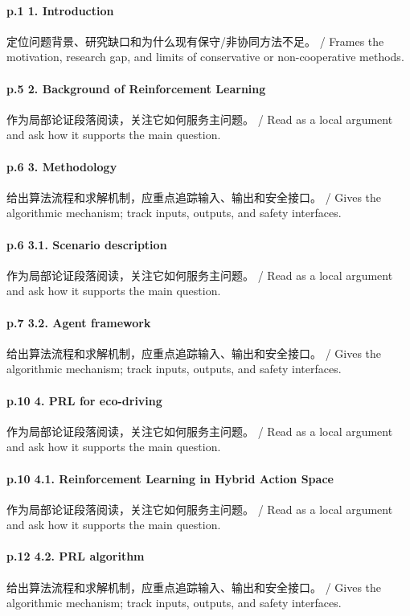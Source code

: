 \documentclass[UTF8,a4paper,11pt,fontset=fandol]{ctexart}
\begin{document}
\paragraph{p.1 1. Introduction}定位问题背景、研究缺口和为什么现有保守/非协同方法不足。 / Frames the motivation, research gap, and limits of conservative or non-cooperative methods.

\paragraph{p.5 2. Background of Reinforcement Learning}作为局部论证段落阅读，关注它如何服务主问题。 / Read as a local argument and ask how it supports the main question.

\paragraph{p.6 3. Methodology}给出算法流程和求解机制，应重点追踪输入、输出和安全接口。 / Gives the algorithmic mechanism; track inputs, outputs, and safety interfaces.

\paragraph{p.6 3.1. Scenario description}作为局部论证段落阅读，关注它如何服务主问题。 / Read as a local argument and ask how it supports the main question.

\paragraph{p.7 3.2. Agent framework}给出算法流程和求解机制，应重点追踪输入、输出和安全接口。 / Gives the algorithmic mechanism; track inputs, outputs, and safety interfaces.

\paragraph{p.10 4. PRL for eco-driving}作为局部论证段落阅读，关注它如何服务主问题。 / Read as a local argument and ask how it supports the main question.

\paragraph{p.10 4.1. Reinforcement Learning in Hybrid Action Space}作为局部论证段落阅读，关注它如何服务主问题。 / Read as a local argument and ask how it supports the main question.

\paragraph{p.12 4.2. PRL algorithm}给出算法流程和求解机制，应重点追踪输入、输出和安全接口。 / Gives the algorithmic mechanism; track inputs, outputs, and safety interfaces.
\end{document}

